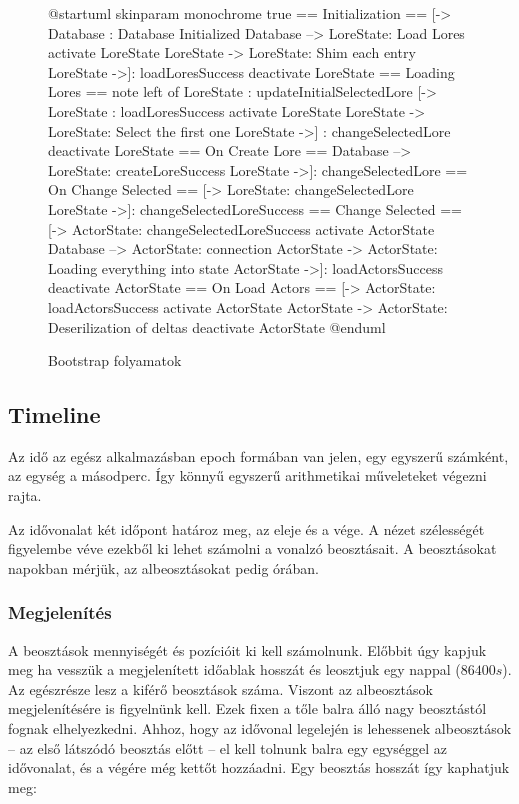 \begin{figure}[h!]
	\centering
	\begin{plantuml}
		@startuml
		skinparam monochrome true
		== Initialization ==
		[-> Database : Database Initialized
		Database --> LoreState: Load Lores
		activate LoreState
		LoreState -> LoreState: Shim each entry
		LoreState ->]: loadLoresSuccess
		deactivate LoreState
		== Loading Lores ==
		note left of LoreState : updateInitialSelectedLore
		[-> LoreState : loadLoresSuccess
		activate LoreState
		LoreState -> LoreState: Select the first one
		LoreState ->] : changeSelectedLore
		deactivate LoreState
		== On Create Lore ==
		Database --> LoreState: createLoreSuccess
		LoreState ->]: changeSelectedLore
		== On Change Selected ==
		[-> LoreState: changeSelectedLore
		LoreState ->]: changeSelectedLoreSuccess
		== Change Selected ==
		[-> ActorState: changeSelectedLoreSuccess
		activate ActorState
		Database --> ActorState: connection
		ActorState -> ActorState: Loading everything into state
		ActorState ->]: loadActorsSuccess
		deactivate ActorState
		== On Load Actors ==
		[-> ActorState: loadActorsSuccess
		activate ActorState
		ActorState -> ActorState: Deserilization of deltas
		deactivate ActorState
		@enduml
	\end{plantuml}
	\caption{Bootstrap folyamatok}
	\label{fig:global-state-bootstrap}
\end{figure}


\subsection{Timeline}

Az idő az egész alkalmazásban epoch \cite{Epoch} formában van jelen, egy egyszerű számként, az egység a másodperc. Így könnyű egyszerű arithmetikai műveleteket végezni rajta.

Az idővonalat két időpont határoz meg, az eleje és a vége. A nézet szélességét figyelembe véve ezekből ki lehet számolni a vonalzó beosztásait. A beosztásokat napokban mérjük, az albeosztásokat pedig órában.

\subsubsection{Megjelenítés}

A beosztások mennyiségét és pozícióit ki kell számolnunk. Előbbit úgy kapjuk meg ha vesszük a megjelenített időablak hosszát és leosztjuk egy nappal ($86400s$). Az egészrésze lesz a kiférő beosztások száma. Viszont az albeosztások megjelenítésére is figyelnünk kell. Ezek fixen a tőle balra álló nagy beosztástól fognak elhelyezkedni. Ahhoz, hogy az idővonal legelején is lehessenek albeosztások -- az első látszódó beosztás előtt -- el kell tolnunk balra egy egységgel az idővonalat, és a végére még kettőt hozzáadni. Egy beosztás hosszát így kaphatjuk meg:

